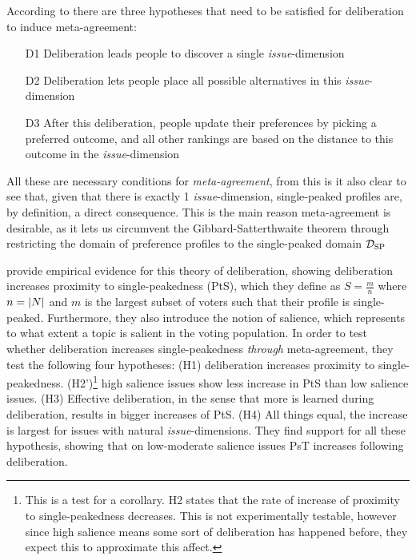 According to \citet{listTwoConceptsAgreement2002} there are three hypotheses that need to be satisfied for deliberation to induce meta-agreement:
\begin{enumerate}
	\label{list:meta-agreement-checklist}
	\setlength\itemsep{1px}
	\item [D1] Deliberation leads people to discover a single \emph{issue}-dimension
	\item [D2] Deliberation lets people place all possible alternatives in this \emph{issue}-dimension
	\item [D3] After this deliberation, people update their preferences by picking
	      a preferred outcome, and all other rankings are based on the distance to this outcome in the \emph{issue}-dimension
\end{enumerate}

All these are necessary conditions for \emph{meta-agreement}, from this is it
also clear to see that, given that there is exactly 1 \emph{issue}-dimension,
single-peaked profiles are, by definition, a direct consequence. This is the
main reason meta-agreement is desirable, as it lets us circumvent the
Gibbard-Satterthwaite theorem \citep{gibbardManipulationVotingSchemes1973,
	satterthwaiteStrategyproofnessArrowsConditions1975} through restricting the
domain of preference profiles to the single-peaked domain $\mathcal{D}_{\textnormal{SP}}$


\citet{listDeliberationSinglePeakednessPossibility2013} provide empirical
evidence for this theory of deliberation, showing deliberation increases
proximity to single-peakedness (PtS), which they define as $S= \frac{m}{n}$
where $n = |N|$ and $m$ is the largest subset of voters such that their
profile is single-peaked. Furthermore, they also introduce the notion of
salience, which represents to what extent a topic is salient in the voting
population. In order to test whether deliberation increases single-peakedness
\emph{through} meta-agreement, they test the following four hypotheses: (H1)
deliberation increases proximity to single-peakedness. (H2')\footnote{This is a
	test for a corollary. H2 states that the rate of increase of proximity to
	single-peakedness decreases. This is not experimentally testable, however since
	high salience means some sort of deliberation has happened before, they expect
	this to approximate this affect.} high salience issues show less increase in
PtS than low salience issues. (H3) Effective deliberation, in the sense that
more is learned during deliberation, results in bigger increases of PtS. (H4)
All things equal, the increase is largest for issues with natural
\emph{issue}-dimensions. They find support for all these hypothesis, showing
that on low-moderate salience issues PsT increases following deliberation.

